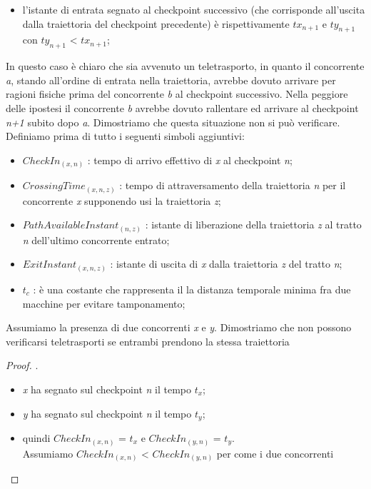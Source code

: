 \begin{itemize}
\begin{itemize}
\item l'istante di entrata segnato al checkpoint successivo (che corrisponde all'uscita dalla traiettoria del checkpoint precedente) è
rispettivamente \emph{$tx_{n+1}$} e \emph{$ty_{n+1}$} con \emph{$ty_{n+1}$} < \emph{$tx_{n+1}$};
\end{itemize}
In questo caso è chiaro che sia avvenuto un teletrasporto, in quanto il concorrente \emph{a}, stando all'ordine di entrata nella
traiettoria, avrebbe dovuto arrivare per ragioni fisiche prima del concorrente \emph{b} al checkpoint successivo. Nella peggiore 
delle ipostesi il concorrente \emph{b} avrebbe dovuto rallentare ed arrivare al checkpoint \emph{n+1} subito dopo \emph{a}. 
Dimostriamo che questa situazione non si può verificare. Definiamo prima di tutto i seguenti simboli aggiuntivi:
\begin{itemize}
\item $CheckIn_{(x,n)}$ : tempo di arrivo effettivo di \emph{x} al checkpoint \emph{n};
\item $CrossingTime_{(x,n,z)}$ : tempo di attraversamento della traiettoria \emph{n} per il concorrente \emph{x} supponendo usi la traiettoria
\emph{z}; 
\item $PathAvailableInstant_{(n,z)}$ : istante di liberazione della traiettoria \emph{z} al tratto \emph{n} dell'ultimo concorrente entrato;
\item $ExitInstant_{(x,n,z)}$ : istante di uscita di \emph{x} dalla traiettoria \emph{z} del tratto \emph{n};
\item $t_c$ : è una costante che rappresenta il la distanza temporale minima fra due macchine per evitare tamponamento;
\end{itemize}
Assumiamo la presenza di due concorrenti \emph{x} e \emph{y}. Dimostriamo che non possono verificarsi teletrasporti se entrambi
prendono la stessa traiettoria
\begin{proof}.
\begin{itemize}
\item \emph{x} ha segnato sul checkpoint \emph{n} il tempo \emph{$t_x$};
\item \emph{y} ha segnato sul checkpoint \emph{n} il tempo \emph{$t_y$};
\item quindi $CheckIn_{(x,n)}$ = $t_x$ e $CheckIn_{(y,n)}$ = $t_y$. 
\\Assumiamo $CheckIn_{(x,n)}$ < $CheckIn_{(y,n)}$ per come i due concorrenti

\end{itemize}
\end{proof}
\end{itemize}
